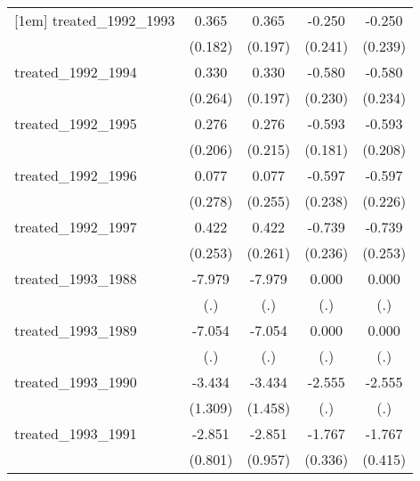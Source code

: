 {\begin{tabular}{l*{4}{c}}
[1em]
treated\_1992\_1993&       0.365\sym{*}  &       0.365         &      -0.250         &      -0.250         \\
            &     (0.182)         &     (0.197)         &     (0.241)         &     (0.239)         \\
[1em]
treated\_1992\_1994&       0.330         &       0.330         &      -0.580\sym{*}  &      -0.580\sym{*}  \\
            &     (0.264)         &     (0.197)         &     (0.230)         &     (0.234)         \\
[1em]
treated\_1992\_1995&       0.276         &       0.276         &      -0.593\sym{**} &      -0.593\sym{**} \\
            &     (0.206)         &     (0.215)         &     (0.181)         &     (0.208)         \\
[1em]
treated\_1992\_1996&       0.077         &       0.077         &      -0.597\sym{*}  &      -0.597\sym{**} \\
            &     (0.278)         &     (0.255)         &     (0.238)         &     (0.226)         \\
[1em]
treated\_1992\_1997&       0.422         &       0.422         &      -0.739\sym{**} &      -0.739\sym{**} \\
            &     (0.253)         &     (0.261)         &     (0.236)         &     (0.253)         \\
[1em]
treated\_1993\_1988&      -7.979         &      -7.979         &       0.000         &       0.000         \\
            &         (.)         &         (.)         &         (.)         &         (.)         \\
[1em]
treated\_1993\_1989&      -7.054         &      -7.054         &       0.000         &       0.000         \\
            &         (.)         &         (.)         &         (.)         &         (.)         \\
[1em]
treated\_1993\_1990&      -3.434\sym{**} &      -3.434\sym{*}  &      -2.555         &      -2.555         \\
            &     (1.309)         &     (1.458)         &         (.)         &         (.)         \\
[1em]
treated\_1993\_1991&      -2.851\sym{***}&      -2.851\sym{**} &      -1.767\sym{***}&      -1.767\sym{***}\\
            &     (0.801)         &     (0.957)         &     (0.336)         &     (0.415)         \\

\end{tabular}}
